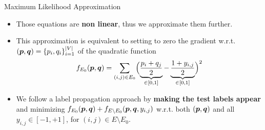 \documentclass[10pt,svgnames,ignorenonframetext,final]{beamer}
\providecommand{\largelist}{%
  \setlength{\itemsep}{8pt}\setlength{\parskip}{3pt}}
\begin{document}
\begin{frame}{Maximum Likelihood Approximation}

  \begin{itemize}[<+->]
    \largelist
  \item
    Those equations are \textbf{non linear}, thus we
approximate them further.

  \item
This approximation is equivalent to setting to zero the gradient
w.r.t.~\((\boldsymbol{p},\boldsymbol{q}) =\{p_i, q_i\}_{i=1}^{|V|}\) of the quadratic function
\[f_{E_0}(\boldsymbol{p},\boldsymbol{q}) = \sum_{(i,j) \in E_0} \Bigl(\underbrace{\frac{p_i+q_j}{2}}_{\in [0,1]} -
\underbrace{\frac{1+y_{i,j}}{2}}_{\in [0,1]} \Bigr)^2\]

  \item We follow a label propagation approach by \textbf{making the test labels appear} and 
    minimizing \alert{\(f_{E_0}(\boldsymbol{p},\boldsymbol{q}) + f_{E\setminus
    E_0}(\boldsymbol{p},\boldsymbol{q}, {y_{i,j}})\)} w.r.t. both \((\boldsymbol{p},\boldsymbol{q})\) and all \(y_{i,j} \in [-1,+1]\), for \((i,j)\in
E\setminus E_0\).

\end{itemize}

\end{frame}
\end{document}
